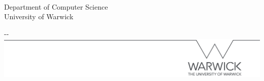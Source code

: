 \makeatletter
\begin{titlepage}

\textbf{\Huge \@title} \\
\Large \@assignment \\[1.5cm] 
\Large \textbf{\@author} \\
Department of Computer Science \\
University of Warwick \\

\vfill 

\begin{adjustwidth}{-\oddsidemargin-1in}{-\rightmargin}
    \centering
    \includegraphics[width=\paperwidth]{../common/line.png}
\end{adjustwidth}

\vspace*{-3.5cm}

\end{titlepage}
\makeatother